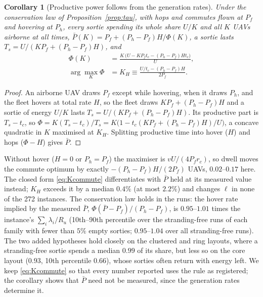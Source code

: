 \documentclass[journal,outdir=./]{IEEEtran}
\newtheorem{corollary}{Corollary}
\newcommand{\rc}{r_{c}}
\newcommand{\Pbar}{\bar{P}}
\newcommand{\Pf}{P_{f}}
\newcommand{\Ph}{P_{h}}
\newcommand{\Ru}{R_u}
\begin{document}
\begin{corollary}[Productive power follows from the generation rates]\label{cor:pbar}
Under the conservation law of Proposition~\ref{prop:tau}, with hops and commutes flown at $\Pf$ and hovering at $\Ph$, every sortie spending its whole share $U/K$ and all $K$ UAVs airborne at all times, $\Pbar(K)=\Pf+(\Ph-\Pf)H/\Phi(K)$, a sortie lasts $T_s=U/(K\Pf+(\Ph-\Pf)H)$, and
\[
\begin{aligned}
\Phi(K)&=\frac{K\,\big(U-K\Pf t_c-(\Ph-\Pf)Ht_c\big)}{U},\\
\arg\max_K\Phi&=K_H\equiv\frac{U/t_c-(\Ph-\Pf)H}{2\Pf}.
\end{aligned}
\]
\end{corollary}
\begin{proof}
An airborne UAV draws $\Pf$ except while hovering, when it draws $\Ph$, and the fleet hovers at total rate $H$, so the fleet draws $K\Pf+(\Ph-\Pf)H$ and a sortie of energy $U/K$ lasts $T_s=U/(K\Pf+(\Ph-\Pf)H)$. Its productive part is $T_s-t_c$, so $\Phi=K(T_s-t_c)/T_s=K\big(1-t_c(K\Pf+(\Ph-\Pf)H)/U\big)$, a concave quadratic in $K$ maximised at $K_H$. Splitting productive time into hover ($H$) and hops ($\Phi-H$) gives $\Pbar$.
\end{proof}
Without hover ($H=0$ or $\Ph=\Pf$) the maximiser is $vU/(4\Pf\rc)$, so dwell moves the commute optimum by exactly $-(\Ph-\Pf)H/(2\Pf)$ UAVs, $0.02$--$0.17$ here. The closed form \eqref{eq:Kcommute} differentiates with $\Pbar$ held at its measured value instead; $K_H$ exceeds it by a median $0.4\%$ (at most $2.2\%$) and changes $\ell$ in none of the 272 instances. The conservation law holds in the runs: the hover rate implied by the measured $\Pbar$, $\Phi(\Pbar-\Pf)/(\Ph-\Pf)$, is $0.95$--$1.01$ times the instance's $\sum_i\lambda_i/\Ru$ (10th--90th percentile over the stranding-free runs of each family with fewer than $5\%$ empty sorties; $0.95$--$1.04$ over all stranding-free runs). The two added hypotheses hold closely on the clustered and ring layouts, where a stranding-free sortie spends a median $0.99$ of its share, but less so on the core layout ($0.93$, 10th percentile $0.66$), whose sorties often return with energy left. We keep \eqref{eq:Kcommute} so that every number reported uses the rule as registered; the corollary shows that $\Pbar$ need not be measured, since the generation rates determine it.
\end{document}
